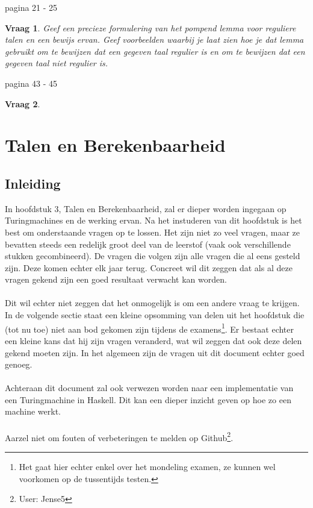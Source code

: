 \documentclass[10pt,a4paper]{article}
\newtheorem{qtext}{Vraag}
\newenvironment{question}{\newpage\begin{qbox}\begin{qtext}}{\end{qtext}\end{qbox}}
\begin{document}
pagina 21 - 25

\newpage

\begin{question}
	Geef een precieze formulering van het pompend lemma voor reguliere talen en een bewijs ervan. Geef voorbeelden waarbij je laat zien hoe je dat lemma gebruikt om te bewijzen dat een gegeven taal regulier is en om te bewijzen dat een gegeven taal niet regulier is.
\end{question}

pagina 43 - 45

\newpage

\begin{question}
	
\end{question}

\section{Talen en Berekenbaarheid}

\subsection{Inleiding}

\vspace{3mm}
In hoofdstuk 3, Talen en Berekenbaarheid, zal er dieper worden ingegaan op Turingmachines en de werking ervan. Na het instuderen van dit hoofdstuk is het best om onderstaande vragen op te lossen. Het zijn niet zo veel vragen, maar ze bevatten steeds een redelijk groot deel van de leerstof (vaak ook verschillende stukken gecombineerd). De vragen die volgen zijn alle vragen die al eens gesteld zijn. Deze komen echter elk jaar terug. Concreet wil dit zeggen dat als al deze vragen gekend zijn een goed resultaat verwacht kan worden.
\\\\
Dit wil echter niet zeggen dat het onmogelijk is om een andere vraag te krijgen. In de volgende sectie staat een kleine opsomming van delen uit het hoofdstuk die (tot nu toe) niet aan bod gekomen zijn tijdens de examens\footnote{Het gaat hier echter enkel over het mondeling examen, ze kunnen wel voorkomen op de tussentijds testen.}. Er bestaat echter een kleine kans dat hij zijn vragen veranderd, wat wil zeggen dat ook deze delen gekend moeten zijn. In het algemeen zijn de vragen uit dit document echter goed genoeg.
\\\\
Achteraan dit document zal ook verwezen worden naar een implementatie van een Turingmachine in Haskell. Dit kan een dieper inzicht geven op hoe zo een machine werkt.
\\\\
Aarzel niet om fouten of verbeteringen te melden op Github\footnote{User: Jense5}.
\end{document}

